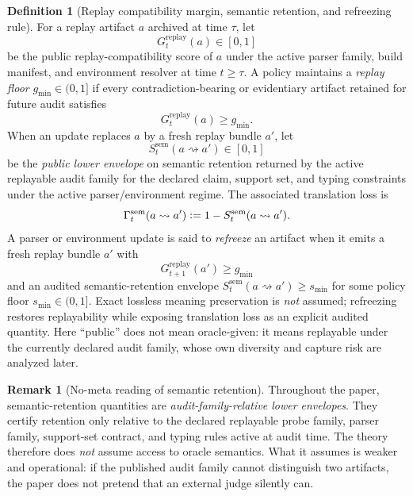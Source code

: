 \documentclass[11pt]{article}
\theoremstyle{definition}
\newtheorem{definition}[theorem]{Definition}
\newtheorem{remark}[theorem]{Remark}
\newcommand{\1}{\mathbf{1}}
\newcommand{\Defeq}{\vcentcolon=}
\begin{document}
\begin{definition}[Replay compatibility margin, semantic retention, and refreezing rule]\label{def:replay_margin}
For a replay artifact $a$ archived at time $\tau$, let
\[
G_t^{\mathrm{replay}}(a)\in[0,1]
\]
be the public replay-compatibility score of $a$ under the active parser family, build manifest, and environment resolver at time $t\ge \tau$. A policy maintains a \emph{replay floor} $g_{\min}\in(0,1]$ if every contradiction-bearing or evidentiary artifact retained for future audit satisfies
\[
G_t^{\mathrm{replay}}(a)\ge g_{\min}.
\]
When an update replaces $a$ by a fresh replay bundle $a'$, let
\[
S_t^{\mathrm{sem}}(a\rightsquigarrow a')\in[0,1]
\]
be the \emph{public lower envelope} on semantic retention returned by the active replayable audit family for the declared claim, support set, and typing constraints under the active parser/environment regime. The associated translation loss is
\[
\Gamma_t^{\mathrm{sem}}(a\rightsquigarrow a')\Defeq 1-S_t^{\mathrm{sem}}(a\rightsquigarrow a').
\]
A parser or environment update is said to \emph{refreeze} an artifact when it emits a fresh replay bundle $a'$ with
\[
G_{t+1}^{\mathrm{replay}}(a')\ge g_{\min}
\]
and an audited semantic-retention envelope $S_t^{\mathrm{sem}}(a\rightsquigarrow a')\ge s_{\min}$ for some policy floor $s_{\min}\in(0,1]$. Exact lossless meaning preservation is \emph{not} assumed; refreezing restores replayability while exposing translation loss as an explicit audited quantity. Here ``public'' does not mean oracle-given: it means replayable under the currently declared audit family, whose own diversity and capture risk are analyzed later.
\end{definition}

\begin{remark}[No-meta reading of semantic retention]\label{rem:no_meta_semantics}
Throughout the paper, semantic-retention quantities are \emph{audit-family-relative lower envelopes}. They certify retention only relative to the declared replayable probe family, parser family, support-set contract, and typing rules active at audit time. The theory therefore does \emph{not} assume access to oracle semantics. What it assumes is weaker and operational: if the published audit family cannot distinguish two artifacts, the paper does not pretend that an external judge silently can.
\end{remark}
\end{document}
